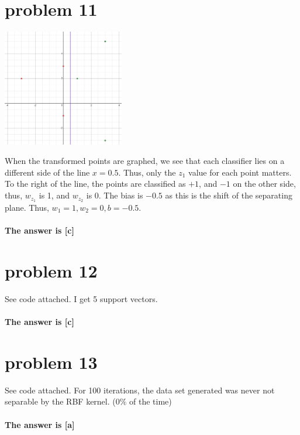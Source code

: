 \documentclass{article}
\begin{document}
\section*{problem 11}
\begin{center}
    \includegraphics[width=200]{156_final_11.PNG}
\end{center}
When the transformed points are graphed, we see that each classifier lies on a different side of the line $x=0.5$. Thus, only the $z_1$ value for each point matters. To the right of the line, the points are classified as $+1$, and $-1$ on the other side, thus, $w_{z_1}$ is 1, and $w_{z_2}$ is 0. The bias is $-0.5$ as this is the shift of the separating plane. Thus, $w_1=1, w_2=0, b = -0.5$.\\\\ 
\textbf{The answer is [c]}

\section*{problem 12}
See code attached. I get 5 support vectors.\\\\
\textbf{The answer is [c]}

\section*{problem 13}
See code attached. For 100 iterations, the data set generated was never not separable by the RBF kernel. ($0\%$ of the time)\\\\
\textbf{The answer is [a]}
\end{document}

